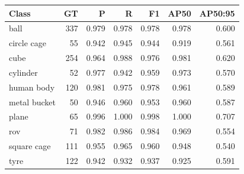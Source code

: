\begin{tabular}{lrrrrrr}
\toprule
Class & GT & P & R & F1 & AP50 & AP50:95 \\
\midrule
ball & 337 & 0.979 & 0.978 & 0.978 & 0.978 & 0.600 \\
circle cage & 55 & 0.942 & 0.945 & 0.944 & 0.919 & 0.561 \\
cube & 254 & 0.964 & 0.988 & 0.976 & 0.981 & 0.620 \\
cylinder & 52 & 0.977 & 0.942 & 0.959 & 0.973 & 0.570 \\
human body & 120 & 0.981 & 0.975 & 0.978 & 0.961 & 0.589 \\
metal bucket & 50 & 0.946 & 0.960 & 0.953 & 0.960 & 0.587 \\
plane & 65 & 0.996 & 1.000 & 0.998 & 1.000 & 0.707 \\
rov & 71 & 0.982 & 0.986 & 0.984 & 0.969 & 0.554 \\
square cage & 111 & 0.955 & 0.965 & 0.960 & 0.948 & 0.540 \\
tyre & 122 & 0.942 & 0.932 & 0.937 & 0.925 & 0.591 \\
\bottomrule
\end{tabular}
